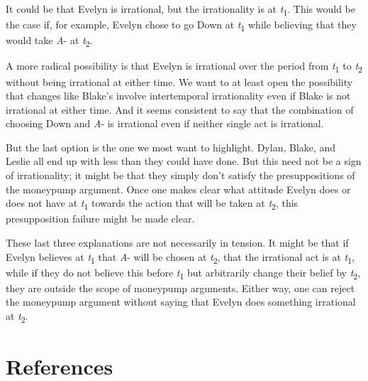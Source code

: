\documentclass[
  11pt,
  letterpaper,
  DIV=11,
  numbers=noendperiod,
  twoside]{scrartcl}
\begin{document}
It could be that Evelyn is irrational, but the irrationality is at
\emph{t}\textsubscript{1}. This would be the case if, for example,
Evelyn chose to go Down at \emph{t}\textsubscript{1} while believing
that they would take \emph{A}- at \emph{t}\textsubscript{2}.

A more radical possibility is that Evelyn is irrational over the period
from \emph{t}\textsubscript{1} to \emph{t}\textsubscript{2} without
being irrational at either time. We want to at least open the
possibility that changes like Blake's involve intertemporal
irrationality even if Blake is not irrational at either time. And it
seems consistent to say that the combination of choosing Down and
\emph{A}- is irrational even if neither single act is irrational.

But the last option is the one we most want to highlight. Dylan, Blake,
and Leslie all end up with less than they could have done. But this need
not be a sign of irrationality; it might be that they simply don't
satisfy the presuppositions of the moneypump argument. Once one makes
clear what attitude Evelyn does or does not have at
\emph{t}\textsubscript{1} towards the action that will be taken at
\emph{t}\textsubscript{2}, this presupposition failure might be made
clear.

These last three explanations are not necessarily in tension. It might
be that if Evelyn believes at \emph{t}\textsubscript{1} that \emph{A}-
will be chosen at \emph{t}\textsubscript{2}, that the irrational act is
at \emph{t}\textsubscript{1}, while if they do not believe this before
\emph{t}\textsubscript{1} but arbitrarily change their belief by
\emph{t}\textsubscript{2}, they are outside the scope of moneypump
arguments. Either way, one can reject the moneypump argument without
saying that Evelyn does something irrational at
\emph{t}\textsubscript{2}.

\section*{References}\label{references}
\end{document}
